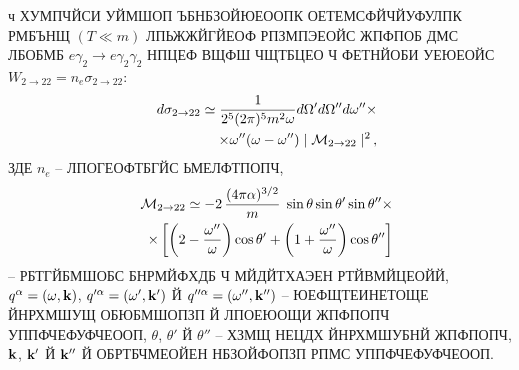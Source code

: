 \documentclass[koi8-r]{pazh2col}
\begin{document}
ч  ХУМПЧЙСИ УЙМШОП ЪБНБЗОЙЮЕООПК ОЕТЕМСФЙЧЙУФУЛПК  РМБЪНЩ $(T \ll m)$
ЛПЬЖЖЙГЙЕОФ РПЗМПЭЕОЙС ЖПФПОБ ДМС  ЛБОБМБ $e \gamma_2 \to e \gamma_2 \gamma_2$
НПЦЕФ ВЩФШ ЧЩТБЦЕО Ч 
ФЕТНЙОБИ  УЕЮЕОЙС   $W_{2 \to 22} = n_e \sigma_{2 \to 22}$:  
%
\begin{eqnarray}
\nonumber
&&d\sigma_{2 \to 22} \simeq \frac{1}{2^5 (2\pi)^5 m^2 \omega} 
 d\Omega'  d\Omega''  d \omega'' \times
\\
\label{eq:crosssec222}
&&\times \omega'' (\omega - \omega'') \mid {\cal M}_{2 \to 22}\mid^2 \, ,
\end{eqnarray}
\noindent ЗДЕ $n_e$ -- ЛПОГЕОФТБГЙС ЬМЕЛФТПОПЧ, 
%
\begin{eqnarray}
\nonumber
&&{\cal M}_{2 \to 22} \simeq -2 \,
\frac{(4 \pi \alpha)^{3/2}}{m} \; \sin{\theta} \sin{\theta'} \sin{\theta''}\times 
\\
\label{eq:amp222}
&&\times \left [ \left(2 - \frac{\omega''}{\omega} \right ) \cos{\theta'} + 
\left(1 + \frac{\omega''}{\omega} \right ) \cos{\theta''}\right ]
\end{eqnarray}
\noindent -- РБТГЙБМШОБС БНРМЙФХДБ Ч МЙДЙТХАЭЕН РТЙВМЙЦЕОЙЙ,  
$q^{\alpha} = (\omega, {\bf k})$, $q'^{\alpha} = (\omega', {\bf k}')$ Й 
$q''^{\alpha} = (\omega'', {\bf k}'')$ -- ЮЕФЩТЕИНЕТОЩЕ ЙНРХМШУЩ ОБЮБМШОПЗП Й ЛПОЕЮОЩИ ЖПФПОПЧ 
УППФЧЕФУФЧЕООП, 
$\theta$, $\theta'$ Й $\theta''$  -- ХЗМЩ НЕЦДХ ЙНРХМШУБНЙ ЖПФПОПЧ, ${\bf k}$, ${\bf k}'$  Й ${\bf k}''$ Й 
ОБРТБЧМЕОЙЕН НБЗОЙФОПЗП РПМС УППФЧЕФУФЧЕООП. 
\end{document}
